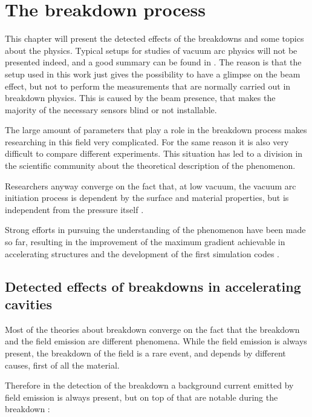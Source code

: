 \chapter[The breakdown process]{The breakdown process}

This chapter will present the detected effects of the breakdowns and some topics about the physics. Typical setups for studies of vacuum arc physics will not be presented indeed, and a good summary can be found in \cite{Kovermann:1330346}. The reason is that the setup used in this work just gives the possibility to have a glimpse on the beam effect, but not to perform the measurements that are normally carried out in breakdown physics. This is caused by the beam presence, that makes the majority of the necessary sensors blind or not installable.

The large amount of parameters that play a role in the breakdown process makes researching in this field very complicated. For the same reason it is also very difficult to compare different experiments. This situation has led to a division in the scientific community about the theoretical description of the phenomenon.

Researchers anyway converge on the fact that, at low vacuum, the vacuum arc initiation process is dependent by the surface and material properties, but is independent from the pressure itself \cite{alpert:triggers}.

Strong efforts in pursuing the understanding of the phenomenon have been made so far, resulting in the improvement of the maximum gradient achievable in accelerating structures and the development of the first simulation codes \cite{Insepov:1373092}.



\section[Detected effects of breakdowns in accelerating cavities]{Detected effects of breakdowns in accelerating cavities}

Most of the theories about breakdown converge on the fact that the breakdown and the field emission are different phenomena. While the field emission is always present, the breakdown of the field is a rare event, and depends by different causes, first of all the material.

Therefore in the detection of the breakdown a background current emitted by field emission is always present, but on top of that are notable during the breakdown \cite{Wuensch:583549}:

